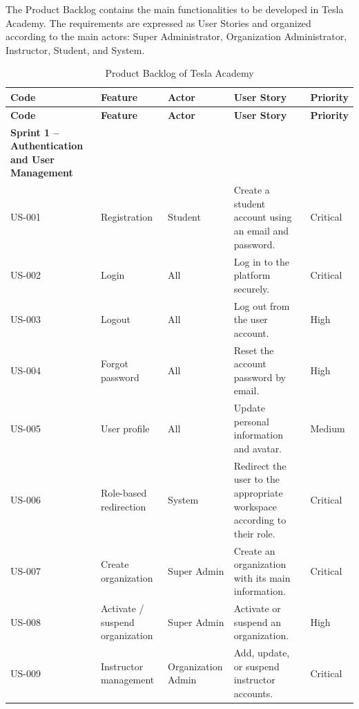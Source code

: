 The Product Backlog contains the main functionalities to be developed in Tesla Academy.
The requirements are expressed as User Stories and organized according to the main actors:
Super Administrator, Organization Administrator, Instructor, Student, and System.

\begingroup
\footnotesize
\setlength{\tabcolsep}{4pt}
\renewcommand{\arraystretch}{1.18}
\begin{longtable}{|p{1.3cm}|p{3cm}|p{2.4cm}|p{7.2cm}|p{1.7cm}|}
  \caption{Product Backlog of Tesla Academy}
  \label{tab:backlog} \\
  \hline
  \textbf{Code} & \textbf{Feature} & \textbf{Actor} & \textbf{User Story} & \textbf{Priority} \\
  \hline
  \endfirsthead

  \hline
  \textbf{Code} & \textbf{Feature} & \textbf{Actor} & \textbf{User Story} & \textbf{Priority} \\
  \hline
  \endhead
  \hline
  \endfoot

  \multicolumn{5}{|l|}\textbf{Sprint 1 -- Authentication and User Management}} \\
  \hline
  US-001 & Registration & Student & Create a student account using an email and password. & Critical \\
  \hline
  US-002 & Login & All & Log in to the platform securely. & Critical \\
  \hline
  US-003 & Logout & All & Log out from the user account. & High \\
  \hline
  US-004 & Forgot password & All & Reset the account password by email. & High \\
  \hline
  US-005 & User profile & All & Update personal information and avatar. & Medium \\
  \hline
  US-006 & Role-based redirection & System & Redirect the user to the appropriate workspace according to their role. & Critical \\
  \hline
  US-007 & Create organization & Super Admin & Create an organization with its main information. & Critical \\
  \hline
  US-008 & Activate / suspend organization & Super Admin & Activate or suspend an organization. & High \\
  \hline
  US-009 & Instructor management & Organization Admin & Add, update, or suspend instructor accounts. & Critical \\
  \hline


\end{longtable}

